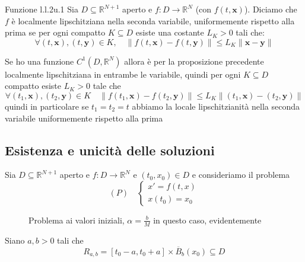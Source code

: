\begin{definition}{Funzione l.l.2u.1}
    Sia \(D \subseteq \mathbb{R}^{N + 1} \) aperto e \(f : D \to
    \mathbb{R}^{N}\) (con \(f(t, \mathbf{x})\)). Diciamo che \(f\) è localmente lipschitziana nella seconda
    variabile, uniformemente rispetto alla prima se per ogni compatto \(K
    \subseteq D\) esiste una costante \(L_K >0\) tali che:
    \[
        \forall (t, \mathbf{x}), (t, \mathbf{y}) \in K, \quad \|f(t, \mathbf{x})
        - f(t, \mathbf{y})\| \le L_K \|\mathbf{x} - \mathbf{y}\|
    \]
\end{definition}
\begin{remark}
    Se ho una funzione \(C^{1}(D, \mathbb{R}^{N})\) allora è per la proposizione
    precedente localmente lipschitziana in entrambe le variabile, quindi per
    ogni \(K\subseteq D  \) compatto esiste \(L_K > 0\) tale che
    \[
        \forall (t_{1}, \mathbf{x}), (t_{2}, \mathbf{y}) \in K \quad \|f(t_{1},
        \mathbf{x}) - f(t_{2}, \mathbf{y})\| \le L_K \|(t_{1}, \mathbf{x}) - (t_{2},
        \mathbf{y})\|
    \]
    quindi in particolare se \(t_{1}=t_{2}=t\) abbiamo la locale lipschitzianità
    nella seconda variabile uniformemente rispetto alla prima
\end{remark}

\subsection{Esistenza e unicità delle soluzioni}
Sia \(D \subseteq \mathbb{R}^{N+1} \) aperto e \(f : D\to \mathbb{R}^{N}\) e
\((t_{0}, x_{0}) \in D\) e consideriamo il problema
\[
    (P) \quad
    \begin{cases}
        x' = f(t, x) \\
        x(t_{0}) = x_{0}
    \end{cases}
\]
\begin{figure}[ht]
    \centering
    \caption{Problema ai valori iniziali, \(\alpha = \frac{b}{M}\) in questo
    caso, evidentemente}\label{fig:problema}
\end{figure}
Siano \(a, b > 0\) tali che 
\[
    R_{a, b}  = [t_{0} - a, t_{0} + a] \times \overline{B}_{b}(x_{0}) \subseteq
    D
\]

